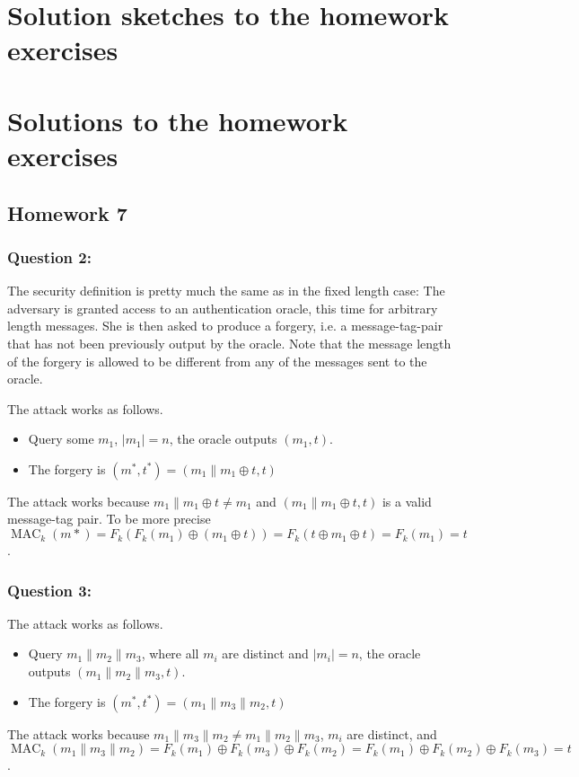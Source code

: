 \documentclass{article}
\numberwithin{defn}{section}
\numberwithin{equation}{section}
\newcommand{\MAC}{\operatorname{MAC}}
\begin{document}
\section*{Solution sketches to the homework exercises}

\section*{Solutions to the homework exercises}

\subsection*{Homework 7}


\subsubsection*{Question 2:} The security definition is pretty much the same as in the fixed length case: The adversary is granted access to an authentication oracle, this time for arbitrary length messages. She is then asked to produce a forgery, i.e. a message-tag-pair that has not been previously output by the oracle. Note that the message length of the forgery is allowed to be different from any of the messages sent to the oracle.

The attack works as follows. 
\begin{itemize}
	\item Query some $m_1$, $|m_1|=n$, the oracle outputs $( m_1,t )$.
	\item The forgery is $(m^*,t^*)=( m_1\| m_1\oplus t,t )$
\end{itemize}	
The attack works because $m_1\| m_1\oplus t\neq m_1$ and $( m_1\| m_1\oplus t,t )$ is a valid message-tag pair. To be more precise $\MAC_k(m*)=F_k( F_k(m_1)\oplus (m_1\oplus t ))=F_k( t\oplus m_1\oplus t )=F_k(m_1)=t$.

\subsubsection*{Question 3:}
The attack works as follows. 
\begin{itemize}
	\item Query $m_1\|m_2\|m_3$, where all $m_i$ are distinct and $|m_i|=n$, the oracle outputs $(m_1\|m_2\|m_3,t )$.
	\item The forgery is $(m^*,t^*)=( m_1\|m_3\|m_2,t )$
\end{itemize}	
The attack works because $m_1\|m_3\|m_2\neq m_1\|m_2\|m_3$, $m_i$ are distinct, and $\MAC_k(m_1\|m_3\|m_2)=F_k(m_1)\oplus F_k(m_3)\oplus F_k(m_2)=F_k(m_1)\oplus F_k(m_2)\oplus F_k(m_3) =t$.
\end{document}
